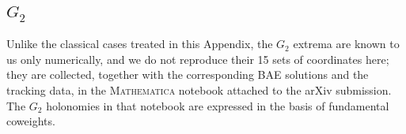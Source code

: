 \documentclass[aps, prx, nofootinbib, twocolumn,amsfonts,amsmath,amssymb,mathtools,superscriptaddress,preprintnumbers,floatfix,reprint]{revtex4-2}
\begin{document}
\subsection{\texorpdfstring{$G_2$}{G2}}
\label{sub:G2CM}

Unlike the classical cases treated in this Appendix, the $G_2$ extrema are known to us only numerically, and we do not reproduce their 15 sets of coordinates here; they are collected, together with the corresponding BAE solutions and the tracking data, in the \textsc{Mathematica} notebook attached to the arXiv submission. The $G_2$ holonomies in that notebook are expressed in the basis of fundamental coweights. 



\end{document}
